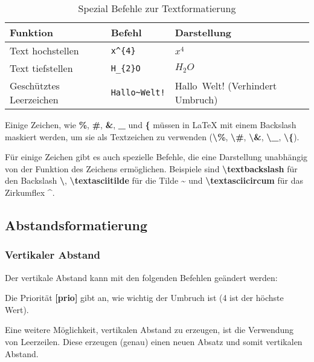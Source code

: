 \begin{table}[H]
    \centering
    \begin{tabular}{lll}
        \toprule
        \textbf{Funktion}       & \textbf{Befehl}                     & \textbf{Darstellung}             \\
        \midrule
        Text hochstellen        & \texttt{x\textasciicircum\{4\}}     & $x^{4}$                          \\
        Text tiefstellen        & \texttt{H\_\{2\}O}                  & $H_{2}O$                         \\
        Geschütztes Leerzeichen & \texttt{Hallo\textasciitilde Welt!} & Hallo~Welt! (Verhindert Umbruch) \\
        \bottomrule
    \end{tabular}
    \caption{Spezial Befehle zur Textformatierung}
    \label{tab:textformatierung}
\end{table}

Einige Zeichen, wie \textbf{\%}, \textbf{\#}, \textbf{\&}, \textbf{\_} und \textbf{\{} müssen in \LaTeX{} mit einem Backslash maskiert werden, um sie als Textzeichen zu verwenden (\textbf{\textbackslash\%}, \textbf{\textbackslash\#}, \textbf{\textbackslash\&}, \textbf{\textbackslash\_}, \textbf{\textbackslash\{}).

Für einige Zeichen gibt es auch spezielle Befehle, die eine Darstellung unabhängig von der Funktion des Zeichens ermöglichen. Beispiele sind \textbf{\textbackslash textbackslash} für den Backslash \textbf{\textbackslash}, \textbf{\textbackslash textasciitilde} für die Tilde \textbf{\textasciitilde} und \textbf{\textbackslash textasciicircum} für das Zirkumflex \textbf{\textasciicircum}.

\newpage

\subsection{Abstandsformatierung}
\subsubsection{Vertikaler Abstand}
Der vertikale Abstand kann mit den folgenden Befehlen geändert werden:



Die Priorität \textbf{[prio]} gibt an, wie wichtig der Umbruch ist (4 ist der höchste Wert).

Eine weitere Möglichkeit, vertikalen Abstand zu erzeugen, ist die Verwendung von Leerzeilen. Diese erzeugen (genau) einen neuen Absatz und somit vertikalen Abstand.

